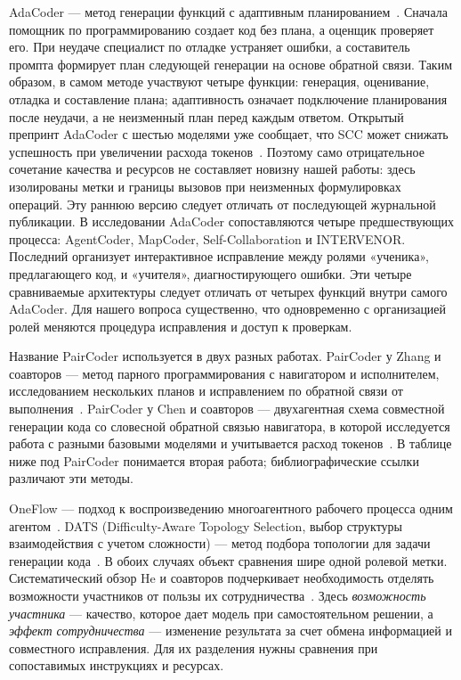 AdaCoder --- метод генерации функций с адаптивным планированием~\cite{zhu2026adacoder}. Сначала помощник по программированию создает код без плана, а оценщик проверяет его. При неудаче специалист по отладке устраняет ошибки, а составитель промпта формирует план следующей генерации на основе обратной связи. Таким образом, в самом методе участвуют четыре функции: генерация, оценивание, отладка и составление плана; адаптивность означает подключение планирования после неудачи, а не неизменный план перед каждым ответом. Открытый препринт AdaCoder с шестью моделями уже сообщает, что SCC может снижать успешность при увеличении расхода токенов~\cite{zhu2025adacoderpreprint}. Поэтому само отрицательное сочетание качества и ресурсов не составляет новизну нашей работы: здесь изолированы метки и границы вызовов при неизменных формулировках операций. Эту раннюю версию следует отличать от последующей журнальной публикации. В исследовании AdaCoder сопоставляются четыре предшествующих процесса: AgentCoder, MapCoder, Self-Collaboration и INTERVENOR. Последний организует интерактивное исправление между ролями «ученика», предлагающего код, и «учителя», диагностирующего ошибки. Эти четыре сравниваемые архитектуры следует отличать от четырех функций внутри самого AdaCoder. Для нашего вопроса существенно, что одновременно с организацией ролей меняются процедура исправления и доступ к проверкам.

Название PairCoder используется в двух разных работах. PairCoder у Zhang и соавторов --- метод парного программирования с навигатором и исполнителем, исследованием нескольких планов и исправлением по обратной связи от выполнения~\cite{zhang2024paircoder}. PairCoder у Chen и соавторов --- двухагентная схема совместной генерации кода со словесной обратной связью навигатора, в которой исследуется работа с разными базовыми моделями и учитывается расход токенов~\cite{chen2026paircoder}. В таблице ниже под PairCoder понимается вторая работа; библиографические ссылки различают эти методы.

OneFlow --- подход к воспроизведению многоагентного рабочего процесса одним агентом~\cite{xu2026oneflow}. DATS (Difficulty-Aware Topology Selection, выбор структуры взаимодействия с учетом сложности) --- метод подбора топологии для задачи генерации кода~\cite{hong2026dats}. В обоих случаях объект сравнения шире одной ролевой метки. Систематический обзор He и соавторов подчеркивает необходимость отделять возможности участников от пользы их сотрудничества~\cite{he2025lma}. Здесь \emph{возможность участника} --- качество, которое дает модель при самостоятельном решении, а \emph{эффект сотрудничества} --- изменение результата за счет обмена информацией и совместного исправления. Для их разделения нужны сравнения при сопоставимых инструкциях и ресурсах.

